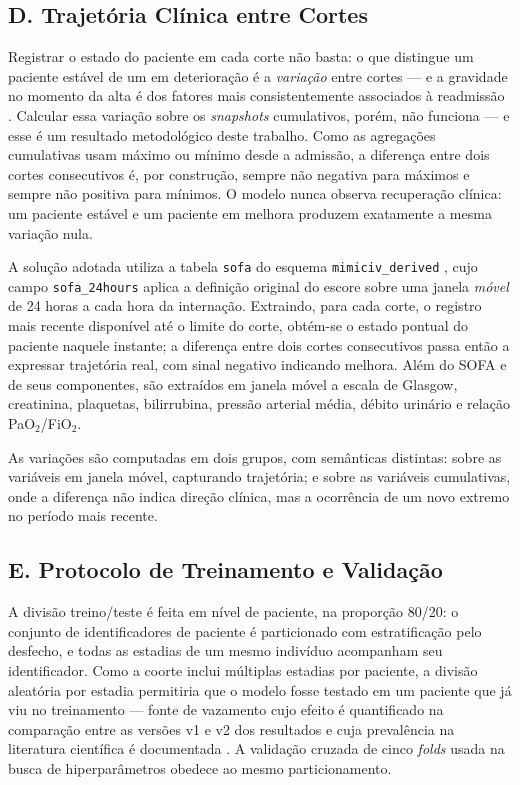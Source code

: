 \documentclass{ieeeaccess}
\begin{document}
\subsection*{D. Trajetória Clínica entre Cortes}
Registrar o estado do paciente em cada corte não basta: o que distingue um paciente estável de um em deterioração é a \textit{variação} entre cortes --- e a gravidade no momento da alta é dos fatores mais consistentemente associados à readmissão \cite{Badilla2025}. Calcular essa variação sobre os \textit{snapshots} cumulativos, porém, não funciona --- e esse é um resultado metodológico deste trabalho. Como as agregações cumulativas usam máximo ou mínimo desde a admissão, a diferença entre dois cortes consecutivos é, por construção, sempre não negativa para máximos e sempre não positiva para mínimos. O modelo nunca observa recuperação clínica: um paciente estável e um paciente em melhora produzem exatamente a mesma variação nula.

A solução adotada utiliza a tabela \texttt{sofa} do esquema \texttt{mimiciv\_derived} \cite{Johnson2023}, cujo campo \texttt{sofa\_24hours} aplica a definição original do escore \cite{Vincent1996} sobre uma janela \textit{móvel} de 24 horas a cada hora da internação. Extraindo, para cada corte, o registro mais recente disponível até o limite do corte, obtém-se o estado pontual do paciente naquele instante; a diferença entre dois cortes consecutivos passa então a expressar trajetória real, com sinal negativo indicando melhora. Além do SOFA e de seus componentes, são extraídos em janela móvel a escala de Glasgow, creatinina, plaquetas, bilirrubina, pressão arterial média, débito urinário e relação PaO$_2$/FiO$_2$.

As variações são computadas em dois grupos, com semânticas distintas: sobre as variáveis em janela móvel, capturando trajetória; e sobre as variáveis cumulativas, onde a diferença não indica direção clínica, mas a ocorrência de um novo extremo no período mais recente.

\subsection*{E. Protocolo de Treinamento e Validação}
A divisão treino/teste é feita em nível de paciente, na proporção 80/20: o conjunto de identificadores de paciente é particionado com estratificação pelo desfecho, e todas as estadias de um mesmo indivíduo acompanham seu identificador. Como a coorte inclui múltiplas estadias por paciente, a divisão aleatória por estadia permitiria que o modelo fosse testado em um paciente que já viu no treinamento --- fonte de vazamento cujo efeito é quantificado na comparação entre as versões v1 e v2 dos resultados e cuja prevalência na literatura científica é documentada \cite{Kapoor2023}. A validação cruzada de cinco \textit{folds} usada na busca de hiperparâmetros obedece ao mesmo particionamento.
\end{document}
